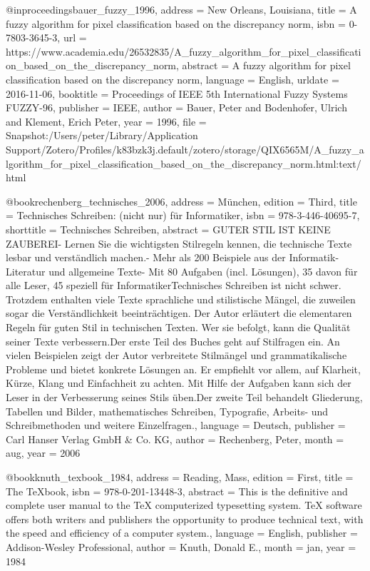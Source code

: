 {{@inproceedings{bauer_fuzzy_1996,
	address = {New Orleans, Louisiana},
	title = {A fuzzy algorithm for pixel classification based on the discrepancy norm},
	isbn = {0-7803-3645-3},
	url = {https://www.academia.edu/26532835/A_fuzzy_algorithm_for_pixel_classification_based_on_the_discrepancy_norm},
	abstract = {A fuzzy algorithm for pixel classification based on the discrepancy norm},
	language = {English},
	urldate = {2016-11-06},
	booktitle = {Proceedings of {IEEE} 5th {International} {Fuzzy} {Systems} {FUZZY}-96},
	publisher = {IEEE},
	author = {Bauer, Peter and Bodenhofer, Ulrich and Klement, Erich Peter},
	year = {1996},
	file = {Snapshot:/Users/peter/Library/Application Support/Zotero/Profiles/k83bzk3j.default/zotero/storage/QIX6565M/A_fuzzy_algorithm_for_pixel_classification_based_on_the_discrepancy_norm.html:text/html}
}

@book{rechenberg_technisches_2006,
	address = {M{\"u}nchen},
	edition = {Third},
	title = {Technisches {Schreiben}: (nicht nur) f{\"u}r {Informatiker}},
	isbn = {978-3-446-40695-7},
	shorttitle = {Technisches {Schreiben}},
	abstract = {GUTER STIL IST KEINE ZAUBEREI- Lernen Sie die wichtigsten Stilregeln kennen, die technische Texte lesbar und verst{\"a}ndlich machen.- Mehr als 200 Beispiele aus der Informatik-Literatur und allgemeine Texte- Mit 80 Aufgaben (incl. L{\"o}sungen), 35 davon f{\"u}r alle Leser, 45 speziell f{\"u}r InformatikerTechnisches Schreiben ist nicht schwer. Trotzdem enthalten viele Texte sprachliche und stilistische M{\"a}ngel, die zuweilen sogar die Verst{\"a}ndlichkeit beeintr{\"a}chtigen. Der Autor erl{\"a}utert die elementaren Regeln f{\"u}r guten Stil in technischen Texten. Wer sie befolgt, kann die Qualit{\"a}t seiner Texte verbessern.Der erste Teil des Buches geht auf Stilfragen ein. An vielen Beispielen zeigt der Autor verbreitete Stilm{\"a}ngel und grammatikalische Probleme und bietet konkrete L{\"o}sungen an. Er empfiehlt vor allem, auf Klarheit, K{\"u}rze, Klang und Einfachheit zu achten. Mit Hilfe der Aufgaben kann sich der Leser in der Verbesserung seines Stils {\"u}ben.Der zweite Teil behandelt Gliederung, Tabellen und Bilder, mathematisches Schreiben, Typografie, Arbeits- und Schreibmethoden und weitere Einzelfragen.},
	language = {Deutsch},
	publisher = {Carl Hanser Verlag GmbH \& Co. KG},
	author = {Rechenberg, Peter},
	month = aug,
	year = {2006}
}

@book{knuth_texbook_1984,
	address = {Reading, Mass},
	edition = {First},
	title = {The {TeXbook}},
	isbn = {978-0-201-13448-3},
	abstract = {This is the definitive and complete user manual to the TeX computerized typesetting system. TeX software offers both writers and publishers the opportunity to produce technical text, with the speed and efficiency of a computer system.},
	language = {English},
	publisher = {Addison-Wesley Professional},
	author = {Knuth, Donald E.},
	month = jan,
	year = {1984}
}

}}
